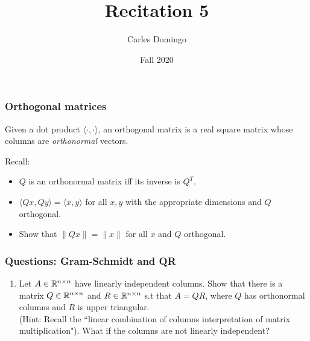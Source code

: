 \documentclass{beamer}
\title{Recitation 5}
\author{Carles Domingo}
\date{Fall 2020}
\begin{document}
\frame{\titlepage} 

\setcounter{showProgressBar}{0}
\setcounter{showSlideNumbers}{1}

\begin{frame}[t]
\frametitle{Orthogonal matrices}
\begin{definition}
	Given a dot product $\langle \cdot, \cdot \rangle$, an orthogonal matrix is a real square matrix whose columns are \emph{orthonormal} vectors.
\end{definition}
Recall:
\begin{itemize}
\item $Q$ is an orthonormal matrix iff its inverse is $Q^{T}$.
\item $\langle Q x, Q y \rangle = \langle x, y \rangle$ for all $x, y$ with the appropriate dimensions and $Q$ orthogonal.
\item Show that $\|Qx\| = \|x\|$ for all $x$ and $Q$ orthogonal.
\end{itemize}
\end{frame}

\iffalse
\begin{frame}[t]
\frametitle{Questions: Orthogonal matrices}
\begin{enumerate}
\item Show the equivalence of the previous page: that $Q$ is an orthogonal matrix iff $Q^{-1} = Q^{\top}$.
\item Show that $\langle Q x, Q y \rangle = \langle x, y \rangle$ for all $x, y$ with the appropriate dimensions and $Q$ orthogonal.
\item Show that $\|Qx\| = \|x\|$ for all $x$ and $Q$ orthogonal.
\pause
\pause
\end{enumerate}
\end{frame}
\fi

\begin{frame}[t]
\frametitle{Questions: Gram-Schmidt and QR}
\begin{enumerate}
\item Let $A\in \mathbb{R}^{n\times n}$ have linearly independent columns. Show that there is a matrix $Q\in \mathbb{R}^{n \times n}$ and $R \in \mathbb{R}^{n\times n} $ s.t that $A=QR$, where $Q$ has orthonormal columns and $R$ is upper triangular. \\
(Hint: Recall the ``linear combination of columns interpretation of matrix multiplication"). What if the columns are not linearly independent?
\end{enumerate}
\pause
\pause
\end{frame}
\end{document}
